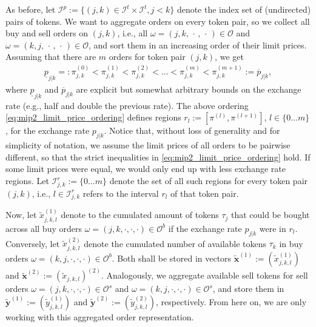 \documentclass[11pt,parskip=full]{scrartcl}%
\newcommand*{\ie}{i.e., }
\newcommand*{\eg}{e.g., }
\newcommand*{\orders}{\mathcal{O}}          %
\newcommand*{\buyorders}{\mathcal{O}^b}     %
\newcommand*{\sellorders}{\mathcal{O}^s}    %
\newcommand*{\itokens}{\mathcal{I}^t}       %
\newcommand*{\itokenpairs}{\mathcal{I}^p}   %
\begin{document}
As before, let $ \itokenpairs := \{(j,k) \in \itokens \times \itokens, j < k\} $ denote the index
set of (undirected) pairs of tokens.
We want to aggregate orders on every token pair, so we collect all buy and sell orders on
$ (j,k) $, \ie all $ \omega = (j, k,\, \cdot \,,\, \cdot \,) \in \orders $ and
$ \omega = (k, j,\, \cdot \,,\,\cdot \,) \in \orders $, and sort them in an increasing order of
their limit prices.
Assuming that there are $ m $ orders for token pair $ (j,k) $, we get
\begin{align}
  \underline{p}_{j|k} =:
    \pi^{(0)}_{j,k} < \pi^{(1)}_{j,k} < \pi^{(2)}_{j,k} <
    \ldots < \pi^{(m)}_{j,k} < \pi^{(m+1)}_{j,k}
  := \overline{p}_{j|k},
  \label{eq:mip2_limit_price_ordering}
\end{align}
where $ \underline{p}_{j|k} $ and $ \overline{p}_{j|k} $ are explicit but somewhat arbitrary bounds
on the exchange rate (\eg half and double the previous rate).
The above ordering \eqref{eq:mip2_limit_price_ordering} defines regions
$ r_l := [\pi^{(l)},\pi^{(l+1)}] $, $ l \in \{0 \ldots m\} $, for the exchange rate $ p_{j|k} $.
Notice that, without loss of generality and for simplicity of notation, we assume the limit prices
of all orders to be pairwise different, so that the strict inequalities in 
\eqref{eq:mip2_limit_price_ordering} hold.
If some limit prices were equal, we would only end up with less exchange rate regions.
Let $ \mathcal{I}_{j,k}^r := \{0 \ldots m\} $ denote the set of all such regions for every token
pair $ (j,k) $, \ie $ l \in \mathcal{I}_{j,k}^r $ refers to the interval $ r_l $ of that token
pair.

Now, let $ \tilde{x}_{j,k,l}^{(1)} $ denote to the cumulated amount of tokens $ \tau_j $ that could
be bought across all buy orders $ \omega = (j,k,\cdot,\cdot,\cdot) \in \buyorders $ if the
exchange rate $ p_{j|k} $ were in $ r_l $.
Conversely, let $ \tilde{x}_{j,k,l}^{(2)} $ denote the cumulated number of available tokens
$ \tau_k $ in buy orders $ \omega = (k,j,\cdot,\cdot,\cdot) \in \buyorders $.
Both shall be stored in vectors $ \tilde{\mathbf{x}}^{(1)} := (\tilde{x}_{j,k,l}^{(1)}) $ and
$ \tilde{\mathbf{x}}^{(2)} := (\tilde{x}_{j,k,l})^{(2)} $.
Analogously, we aggregate available sell tokens for sell orders
$ \omega = (j,k,\cdot,\cdot,\cdot) \in \sellorders $ and
$ \omega = (k,j,\cdot,\cdot,\cdot) \in \sellorders $, and store them in
$ \tilde{\mathbf{y}}^{(1)} := (\tilde{y}_{j,k,l}^{(1)}) $
and $ \tilde{\mathbf{y}}^{(2)} := (\tilde{y}_{j,k,l}^{(2)}) $, respectively.
From here on, we are only working with this aggregated order representation.
\end{document}
